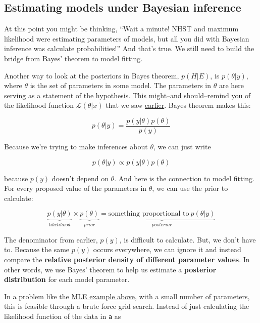 \documentclass[
  13,
  letterpaper,
]{report}
\begin{document}
\subsection{Estimating models under Bayesian
inference}\label{sec-intro-bayes-est}

At this point you might be thinking, ``Wait a minute! NHST and maximum
likelihood were estimating parameters of models, but all you did with
Bayesian inference was calculate probabilities!'' And that's true. We
still need to build the bridge from Bayes' theorem to model fitting.

Another way to look at the posteriors in Bayes theorem,
\(p\left(H|E\right)\), is \(p\left(\theta|y\right)\), where \(\theta\)
is the set of parameters in some model. The parameters in \(\theta\) are
here serving as a statement of the hypothesis. This might--and
should--remind you of the likelihood function
\(\mathcal{L}\left(\theta|x\right)\) that we saw
\href{@sec-intro-mle-intro}{earlier}. Bayes theorem makes this:

\[p\left(\theta|y\right)=\frac{p\left(y|\theta\right)p\left(\theta\right)}{p\left(y\right)}\]

Because we're trying to make inferences about \(\theta\), we can just
write

\[p\left(\theta|y\right)\propto p\left(y|\theta\right)p\left(\theta\right)\]

because \(p\left(y\right)\) doesn't depend on \(\theta\). And here is
the connection to model fitting. For every proposed value of the
parameters in \(\theta\), we can use the prior to calculate:

\[\underbrace{p\left(y|\theta\right)}_{likelihood}\times\underbrace{p\left(\theta\right)}_{prior}=\underbrace{\text{something proportional to}~p\left(\theta|y\right)}_{posterior}\]

The denominator from earlier, \(p\left(y\right)\), is difficult to
calculate. But, we don't have to. Because the same \(p\left(y\right)\)
occurs everywhere, we can ignore it and instead compare the
\textbf{relative posterior density of different parameter values}. In
other words, we use Bayes' theorem to help us estimate a
\textbf{posterior distribution} for each model parameter.

In a problem like the \href{@sec-intro-mle-example}{MLE example above},
with a small number of parameters, this is feasible through a brute
force grid search. Instead of just calculating the likelihood function
of the data in \texttt{a} as
\end{document}
